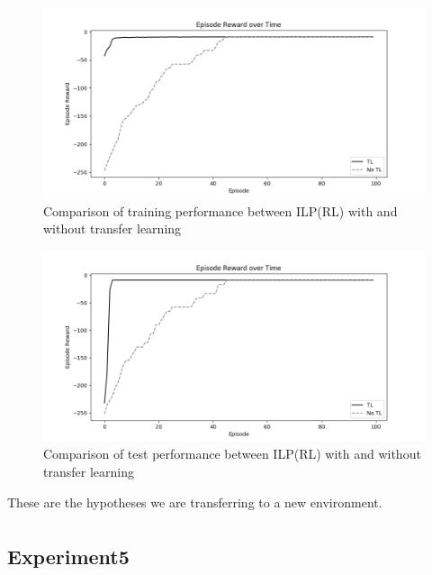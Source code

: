 \begin{figure}[!htb]
\centering
\includegraphics[width=1.0\textwidth]{./figures/experiment4_after_training}
\caption{Comparison of training performance between ILP(RL) with and without transfer learning}
\label{experiment3_training}
\end{figure}

\begin{figure}[!htb]
\centering
\includegraphics[width=1.0\textwidth]{./figures/experiment4_after_test}
\caption{Comparison of test performance between ILP(RL) with and without transfer learning}
\label{experiment3_test}
\end{figure}

These are the hypotheses we are transferring to a new environment.
\begin{equation*}
\begin{split}
\end{split}
\end{equation*}

\newpage
\subsection{Experiment5}

